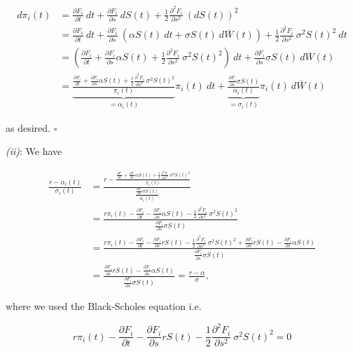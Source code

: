 \documentclass[
]{article}
\begin{document}
\begin{align*}
d\pi_i(t)&=\frac{\partial F_i}{\partial t}\ dt+\frac{\partial F_i}{\partial s}\ dS(t)+\frac{1}{2}\frac{\partial^2 F_i}{\partial s^2}\ (dS(t))^2\\
&=\frac{\partial F_i}{\partial t}\ dt+\frac{\partial F_i}{\partial s}\ (\alpha S(t)\ dt+\sigma S(t)\ d\overline{W}(t))+\frac{1}{2}\frac{\partial^2 F_i}{\partial s^2}\ \sigma^2 S(t)^2\ dt\\
&=\left(\frac{\partial F_i}{\partial t}+\frac{\partial F_i}{\partial s}\alpha S(t)+\frac{1}{2}\frac{\partial^2 F_i}{\partial s^2}\ \sigma^2 S(t)^2\right)\ dt+\frac{\partial F_i}{\partial s}\sigma S(t)\ d\overline{W}(t)\\
&=\underbrace{\frac{\frac{\partial F_i}{\partial t}+\frac{\partial F_i}{\partial s}\alpha S(t)+\frac{1}{2}\frac{\partial^2 F_i}{\partial s^2}\ \sigma^2 S(t)^2}{\pi_i(t)}}_{=\alpha_i(t)}\pi_i(t)\ dt+\underbrace{\frac{\frac{\partial F_i}{\partial s}\sigma S(t)}{\alpha_i(t)}}_{=\sigma_i(t)}\pi_i(t)\ d\overline{W}(t)
\end{align*}

as desired. \(\square\)

\emph{(ii)}: We have

\begin{align*}
\frac{r-\alpha_i(t)}{\sigma_i(t)}&=\frac{r-\frac{\frac{\partial F_i}{\partial t}+\frac{\partial F_i}{\partial s}\alpha S(t)+\frac{1}{2}\frac{\partial^2 F_i}{\partial s^2}\ \sigma^2 S(t)^2}{\pi_i(t)}}{\frac{\frac{\partial F_i}{\partial s}\sigma S(t)}{\alpha_i(t)}}\\
&=\frac{r\pi_i(t)-\frac{\partial F_i}{\partial t}-\frac{\partial F_i}{\partial s}\alpha S(t)-\frac{1}{2}\frac{\partial^2 F_i}{\partial s^2}\ \sigma^2 S(t)^2}{\frac{\partial F_i}{\partial s}\sigma S(t)}\\
&=\frac{r\pi_i(t)-\frac{\partial F_i}{\partial t}-\frac{\partial F_i}{\partial s}r S(t)-\frac{1}{2}\frac{\partial^2 F_i}{\partial s^2}\ \sigma^2 S(t)^2+\frac{\partial F_i}{\partial s}r S(t)-\frac{\partial F_i}{\partial s}\alpha S(t)}{\frac{\partial F_i}{\partial s}\sigma S(t)}\\
&=\frac{\frac{\partial F_i}{\partial s}r S(t)-\frac{\partial F_i}{\partial s}\alpha S(t)}{\frac{\partial F_i}{\partial s}\sigma S(t)}=\frac{r -\alpha }{\sigma },
\end{align*}

where we used the Black-Scholes equation i.e.

\[
r\pi_i(t)-\frac{\partial F_i}{\partial t}-\frac{\partial F_i}{\partial s}r S(t)-\frac{1}{2}\frac{\partial^2 F_i}{\partial s^2}\ \sigma^2 S(t)^2=0
\]
\end{document}
